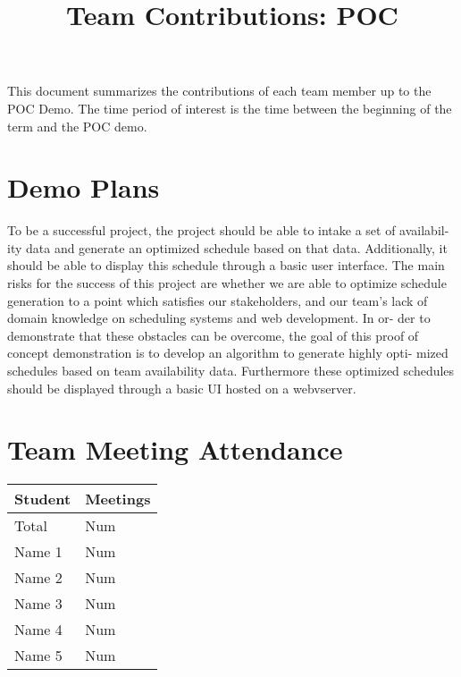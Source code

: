 \documentclass{article}
\title{Team Contributions: POC\\\progname}
\author{\authname}
\date{}
\begin{document}
\maketitle

This document summarizes the contributions of each team member up to the POC
Demo.  The time period of interest is the time between the beginning of the term
and the POC demo.

\section{Demo Plans}


To be a successful project, the project should be able to intake a set of availabil-
ity data and generate an optimized schedule based on that data. Additionally,
it should be able to display this schedule through a basic user interface. The
main risks for the success of this project are whether we are able to optimize
schedule generation to a point which satisfies our stakeholders, and our team’s
lack of domain knowledge on scheduling systems and web development. In or-
der to demonstrate that these obstacles can be overcome, the goal of this proof
of concept demonstration is to develop an algorithm to generate highly opti-
mized schedules based on team availability data. Furthermore these optimized
schedules should be displayed through a basic UI hosted on a webvserver.

\section{Team Meeting Attendance}


\begin{table}[H]
\centering
\begin{tabular}{ll}
\toprule
\textbf{Student} & \textbf{Meetings}\\
\midrule
Total & Num\\
Name 1 & Num\\
Name 2 & Num\\
Name 3 & Num\\
Name 4 & Num\\
Name 5 & Num\\
\bottomrule
\end{tabular}
\end{table}
\end{document}
